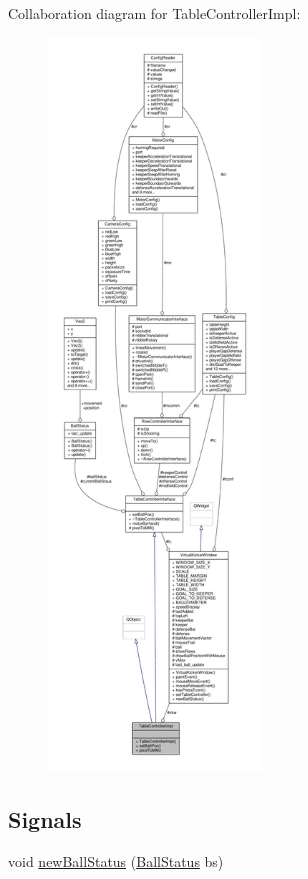 Collaboration diagram for Table\+Controller\+Impl\+:\nopagebreak
\begin{figure}[H]
\begin{center}
\leavevmode
\includegraphics[height=550pt]{class_table_controller_impl__coll__graph}
\end{center}
\end{figure}
\subsection*{Signals}
\begin{DoxyCompactItemize}
\item 
void \hyperlink{class_table_controller_impl_abfd4337861229f9f1b50742e2df19677}{new\+Ball\+Status} (\hyperlink{class_ball_status}{Ball\+Status} bs)
\end{DoxyCompactItemize}
